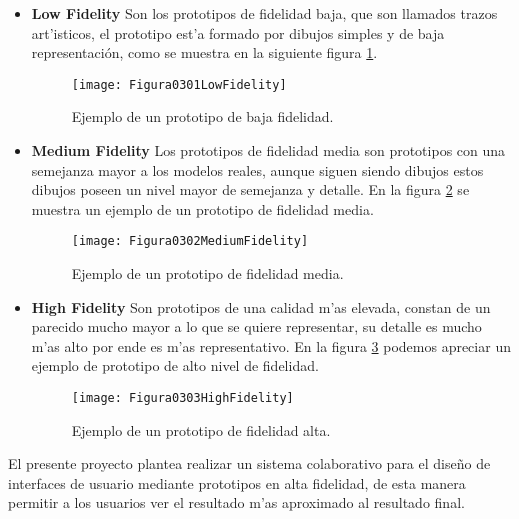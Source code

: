 \begin{itemize}
	\item \textbf{Low Fidelity}
	Son los prototipos de fidelidad baja, que son llamados trazos art'isticos, el prototipo est'a formado por dibujos simples y de baja representación, como se muestra en la siguiente figura \ref{fig:LowFidelity}.

\begin{figure}[ht]
    \centering
    \texttt{[image: Figura0301LowFidelity]}
    \caption{Ejemplo de un prototipo de baja fidelidad.}
    \label{fig:LowFidelity}
\end{figure}
\medskip

	\item \textbf{Medium Fidelity}
	Los prototipos de fidelidad media son prototipos con una semejanza mayor a los modelos reales, aunque siguen siendo dibujos estos dibujos poseen un nivel mayor de semejanza y detalle. En la figura \ref{fig:MediumFidelity} se muestra un ejemplo de un prototipo de fidelidad media.
	
\begin{figure}[ht]
    \centering
    \texttt{[image: Figura0302MediumFidelity]}
    \caption{Ejemplo de un prototipo de fidelidad media.}
    \label{fig:MediumFidelity}
\end{figure}

	\item \textbf{High Fidelity}
	Son prototipos de una calidad m'as elevada, constan de un parecido mucho mayor a lo que se quiere representar, su detalle es mucho m'as alto por ende es m'as representativo. En la figura \ref{fig:HighFidelity} podemos apreciar un ejemplo de prototipo de  alto nivel de fidelidad.

\begin{figure}[ht]
    \centering
    \texttt{[image: Figura0303HighFidelity]}
    \caption{Ejemplo de un prototipo de fidelidad alta.}
    \label{fig:HighFidelity}
\end{figure}	
\end{itemize}

El presente proyecto plantea realizar un sistema colaborativo para el dise\~no de interfaces de usuario mediante prototipos en alta fidelidad, de esta manera permitir a los usuarios ver el resultado m'as aproximado al resultado final.